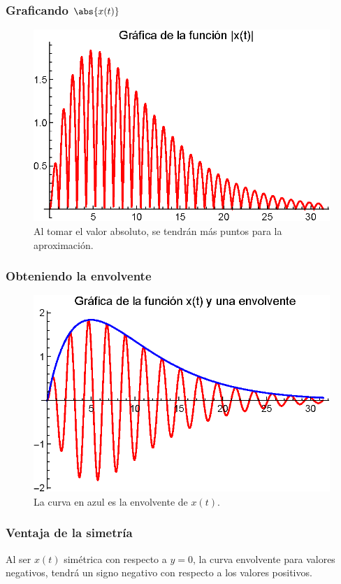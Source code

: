 \begin{frame}
\frametitle{Graficando $\abs{x(t)}$}
\begin{figure}
    \centering
    \includegraphics[scale=1]{Imagenes/Ejemplo_Resonancia_02.eps}
    \caption{Al tomar el valor absoluto, se tendrán más puntos para la aproximación.}
\end{figure}
\end{frame}
\begin{frame}
\frametitle{Obteniendo la envolvente}
\begin{figure}
    \centering
    \includegraphics[scale=1]{Imagenes/Ejemplo_Resonancia_03.eps}
    \caption{La curva en azul es la envolvente de $x(t)$.}
\end{figure}
\end{frame}
\begin{frame}
\frametitle{Ventaja de la simetría}
Al ser $x(t)$ simétrica con respecto a $y = 0$, la curva envolvente para valores negativos, tendrá un signo negativo con respecto a los valores positivos.
\end{frame}
